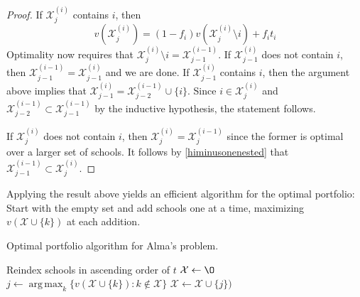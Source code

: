 \documentclass[12pt]{article} %
\DeclareMathOperator*{\argmax}{arg\,max}
\theoremstyle{definition}
\theoremstyle{definition}
\begin{document}
\begin{proof}
If $\mathcal{X}_{j}^{(i)}$ contains $i$, then
\begin{equation}
v(\mathcal{X}_{j}^{(i)}) = (1 - f_i) v(\mathcal{X}_{j}^{(i)}\setminus i) + f_i t_i
\end{equation}
Optimality now requires that $\mathcal{X}_{j}^{(i)}\setminus i = \mathcal{X}_{j-1}^{(i-1)}$. If $\mathcal{X}_{j-1}^{(i)}$ does not contain $i$, then $\mathcal{X}_{j-1}^{(i-1)}  = \mathcal{X}_{j-1}^{(i)}$ and we are done. If $\mathcal{X}_{j-1}^{(i)}$ contains $i$, then the argument above implies that $\mathcal{X}_{j-1}^{(i)} =  \mathcal{X}_{j-2}^{(i-1)}\cup\{i\}$. Since $i \in \mathcal{X}_{j}^{(i)}$ and $\mathcal{X}_{j-2}^{(i-1)} \subset  \mathcal{X}_{j-1}^{(i-1)}$ by the inductive hypothesis, the statement follows. 

If $\mathcal{X}_{j}^{(i)}$ does not contain $i$, then $\mathcal{X}_{j}^{(i)} = \mathcal{X}_{j}^{(i-1)}$ since the former is optimal over a larger set of schools. It follows by \eqref{himinusonenested} that $\mathcal{X}_{j-1}^{(i-1)} \subset \mathcal{X}_{j}^{(i)}$. 
\end{proof}





%
%

Applying the result above yields an efficient algorithm for the optimal portfolio: Start with the empty set and add schools one at a time, maximizing $v(\mathcal{X}\cup \{k\})$ at each addition. 

\begin{algorithm}[H] 
\caption{Optimal portfolio algorithm for Alma’s problem.} \label{dynamicprogram}
\KwData{Utility values $t \in[0, \infty)^m$, admissions probabilities $f \in [0, 1]^m$.}
Reindex schools in ascending order of $t$\;
$\mathcal{X} \gets \O$\;
{
    $j \gets \argmax_k\bigl\{v(\mathcal{X}\cup\{k\}) : k \notin \mathcal{X}\bigr\}$\;
    $\mathcal{X} \gets \mathcal{X}\cup\{j\})$ \;
}
\end{algorithm}
\end{document}
